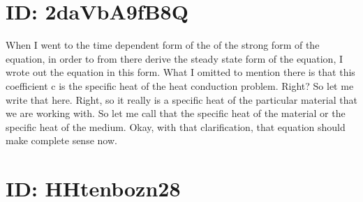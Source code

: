 \documentclass[10pt]{article}
\begin{document}
\section*{ID: 2daVbA9fB8Q}
When I went to the time dependent form of the of the strong form of the equation, in order to from there derive the steady state form of the equation, I wrote out the equation in this form. What I omitted to mention there is that this coefficient c is the specific heat of the heat conduction problem. Right? So let me write that here. Right, so it really is a specific heat of the particular material that we are working with. So let me call that the specific heat of the material or the specific heat of the medium. Okay, with that clarification, that equation should make complete sense now.

\section*{ID: HHtenbozn28}
\end{document}
